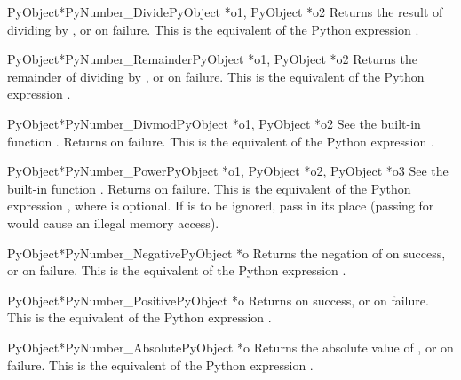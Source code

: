 \documentclass{manual}
\begin{document}
\begin{cfuncdesc}{PyObject*}{PyNumber_Divide}{PyObject *o1, PyObject *o2}
Returns the result of dividing  by , or \NULL{} on
failure. 
This is the equivalent of the Python expression .
\end{cfuncdesc}


\begin{cfuncdesc}{PyObject*}{PyNumber_Remainder}{PyObject *o1, PyObject *o2}
Returns the remainder of dividing  by , or \NULL{} on
failure.  This is the equivalent of the Python expression
.
\end{cfuncdesc}


\begin{cfuncdesc}{PyObject*}{PyNumber_Divmod}{PyObject *o1, PyObject *o2}
See the built-in function .
Returns \NULL{} on failure.  This is the equivalent of the Python
expression .
\end{cfuncdesc}


\begin{cfuncdesc}{PyObject*}{PyNumber_Power}{PyObject *o1, PyObject *o2, PyObject *o3}
See the built-in function .  Returns
\NULL{} on failure. This is the equivalent of the Python expression
, where  is optional.
If  is to be ignored, pass  in its place
(passing \NULL{} for  would cause an illegal memory access).
\end{cfuncdesc}


\begin{cfuncdesc}{PyObject*}{PyNumber_Negative}{PyObject *o}
Returns the negation of  on success, or \NULL{} on failure.
This is the equivalent of the Python expression .
\end{cfuncdesc}


\begin{cfuncdesc}{PyObject*}{PyNumber_Positive}{PyObject *o}
Returns  on success, or \NULL{} on failure.
This is the equivalent of the Python expression .
\end{cfuncdesc}


\begin{cfuncdesc}{PyObject*}{PyNumber_Absolute}{PyObject *o}
Returns the absolute value of , or \NULL{} on failure.  This is
the equivalent of the Python expression .
\end{cfuncdesc}
\end{document}
